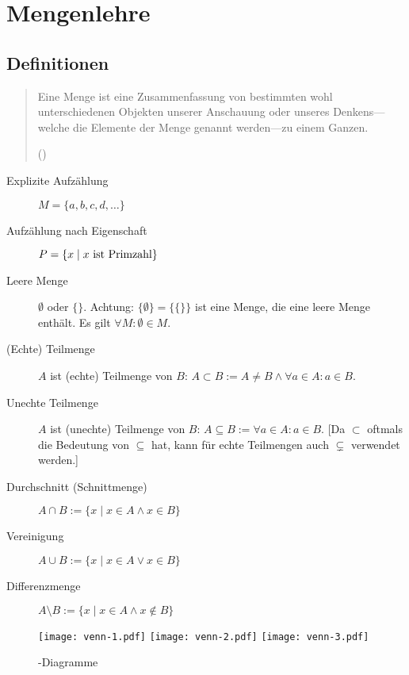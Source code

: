 \chapter{\label{chap:mengenlehre}Mengenlehre}

\section{Definitionen}
\noindent
\begin{quotation}
  Eine Menge ist eine Zusammenfassung von bestimmten wohl unterschiedenen Objekten unserer Anschauung oder un\-ser\-es Denk\-ens---welche die Elemente der Menge genannt werden---zu einem Ganzen.
  \begin{flushright} () \end{flushright}
\end{quotation}

\begin{description}
  \item	[Explizite Aufzählung] 
	$M=\{ a,b,c,d,\ldots\} $
  \item	[Aufzählung nach Eigenschaft] 
	$P=\{ x\mid \hbox{$x$ ist Primzahl}\} $
  \item [Leere Menge] 
	$\emptyset$ oder $\{\}$.
	Achtung: $\{\emptyset\}=\{\{\}\}$ ist eine Menge, die eine leere Menge enthält. Es gilt $\forall M:\emptyset\in M$.
  \item [(Echte) Teilmenge] 
	$A$ ist (echte) Teilmenge von $B$: $A\subset B:=A\neq B\land\forall a\in A:a\in B$.
  \item [Unechte Teilmenge]
	$A$ ist (unechte) Teilmenge von $B$: $A\subseteq B:=\forall a\in A:a\in B$.
    [Da $\subset$ oftmals die Bedeutung von $\subseteq$ hat, kann für echte Teilmengen auch $\subsetneq$ verwendet werden.]
  \item [Durchschnitt (Schnittmenge)] 
	$A\cap B:=\{ x\mid x\in A\land x\in B\} $
  \item [Vereinigung] 
	$A\cup B:=\{ x\mid x\in A\lor x\in B\} $
  \item [Differenzmenge] 
	$A\setminus B:=\{ x\mid x\in A\land x\notin B\} $
\end{description}

\begin{figure}[htb]
\caption{-Diagramme}

\texttt{[image: venn-1.pdf]}
\hfill{}
\texttt{[image: venn-2.pdf]}
\hfill{}
\texttt{[image: venn-3.pdf]}
\end{figure}

